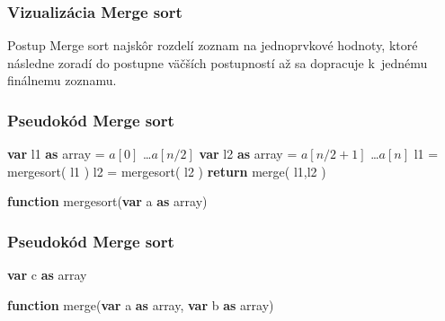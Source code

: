 \documentclass[10pt,xcolor=pdflatex,hyperref={unicode}]{beamer}
\begin{document}
\begin{frame}
\frametitle{Vizualizácia Merge sort}
\begin{block}{Postup}
Merge sort najskôr rozdelí zoznam na jednoprvkové hodnoty, ktoré následne zoradí do postupne väčších postupností až sa dopracuje k~jednému finálnemu zoznamu.
\end{block}
\begin{center}
\end{center}
\end{frame}

\begin{frame}
\frametitle{Pseudokód Merge sort}
\begin{algorithm}[H]
\NoCaptionOfAlgo
\DontPrintSemicolon
	\;
	\textbf{var} l1 \textbf{as} array = $a[0]$ \dots $a[n/2]$\;
	\textbf{var} l2 \textbf{as} array = $a[n/2+1]$ \dots $a[n]$\;
	\;
	l1 = mergesort( l1 )\;
	l2 = mergesort( l2 )\;
	\;
	\textbf{return} merge( l1,l2 )\;
	\caption{\textbf{function} mergesort(\textbf{var} a \textbf{as} array)}
\end{algorithm}
\end{frame}

\begin{frame}
\frametitle{Pseudokód Merge sort}
\begin{algorithm}[H]
\NoCaptionOfAlgo
\DontPrintSemicolon
    \textbf{var} c \textbf{as} array\;
	\caption{\textbf{function} merge(\textbf{var} a \textbf{as} array, \textbf{var} b \textbf{as} array)}
\end{algorithm}
\end{frame}
\end{document}
